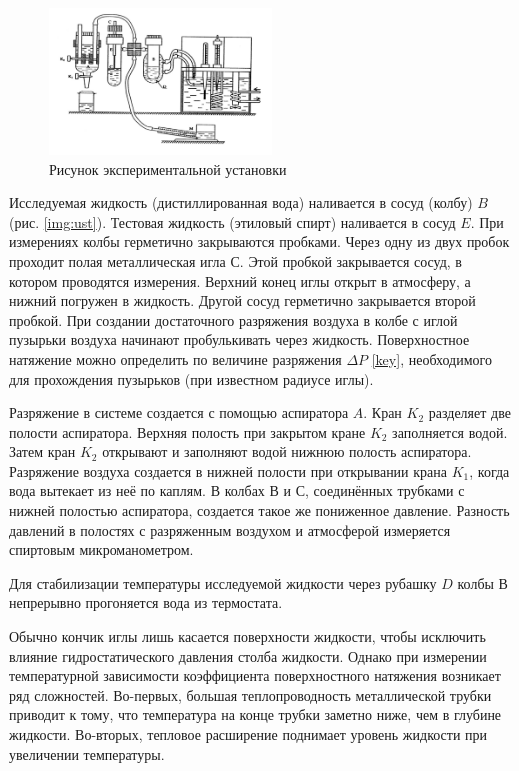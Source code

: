 \documentclass[a4paper,12pt]{article}
\theoremstyle{definition}
\begin{document}
	\begin{figure}
		\begin{center}
			\includegraphics[width=5.9cm]{fac.jpg}
			\caption{Рисунок экспериментальной установки}
			\label{img:ust}
		\end{center}
	\end{figure}
	
	Исследуемая жидкость (дистиллированная вода) наливается в сосуд (колбу) $ B $ (рис. \eqref{img:ust}). Тестовая жидкость  (этиловый спирт) наливается  в сосуд $ E $.  При измерениях  колбы герметично закрываются  пробками. Через одну из двух пробок  проходит полая металлическая игла $ С $. Этой пробкой закрывается сосуд, в котором  проводятся измерения. Верхний конец иглы открыт в атмосферу, а нижний погружен в жидкость. Другой сосуд герметично закрывается второй пробкой. При создании достаточного  разряжения воздуха в колбе с иглой пузырьки воздуха начинают пробулькивать через жидкость. Поверхностное натяжение можно определить по величине разряжения $ \Delta P $ \eqref{key}, необходимого для прохождения пузырьков (при известном радиусе иглы).
	
	Разряжение в системе создается с помощью аспиратора $ A $. Кран $ K_2 $ разделяет две полости аспиратора. Верхняя полость при закрытом кране $ K_2 $ заполняется водой. Затем кран $ K_2 $ открывают и заполняют водой  нижнюю полость  аспиратора.  Разряжение воздуха создается в нижней полости  при открывании крана $ K_1 $, когда  вода вытекает из неё по каплям. В колбах $ В $ и $ С $, соединённых трубками с нижней полостью аспиратора, создается такое же пониженное давление. Разность давлений в полостях с разряженным воздухом и атмосферой измеряется спиртовым микроманометром. 
	
	Для стабилизации температуры исследуемой жидкости через рубашку $ D $ колбы $ В $ непрерывно прогоняется вода из термостата.
	
	Обычно кончик иглы лишь касается поверхности жидкости, чтобы исключить влияние гидростатического давления столба жидкости. Однако при измерении температурной зависимости коэффициента поверхностного натяжения возникает ряд сложностей. Во-первых, большая теплопроводность металлической трубки приводит к тому, что температура на конце трубки заметно ниже, чем в глубине жидкости. Во-вторых, тепловое расширение поднимает уровень жидкости при увеличении температуры.
	
\end{document}
